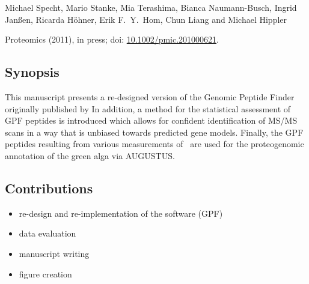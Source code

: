 Michael Specht, Mario Stanke, Mia Terashima, Bianca Naumann-Busch, Ingrid Janßen, Ricarda H\"ohner, Erik F.~Y.~Hom, Chun Liang and Michael Hippler

Proteomics (2011), in press; doi: \href{http://dx.doi.org/10.1002/pmic.201000621}{10.1002/pmic.201000621}.

\label{paper:gpf}

\subsection*{Synopsis}

This manuscript presents a re-designed version of the Genomic Peptide Finder
originally published by \citeauthor{Allmer2004} 
In addition, a method for the statistical assessment of GPF peptides is
introduced which allows for confident identification of MS/MS scans in a
way that is unbiased towards predicted gene models.
Finally, the GPF peptides resulting from various measurements of \cre~are used 
for the proteogenomic annotation of the green alga via AUGUSTUS.

\subsection*{Contributions}

\begin{itemize}
\item re-design and re-implementation of the software (GPF)
\item data evaluation
\item manuscript writing
\item figure creation
\end{itemize}

\cleardoublepage
{}

% 
% 
% 

